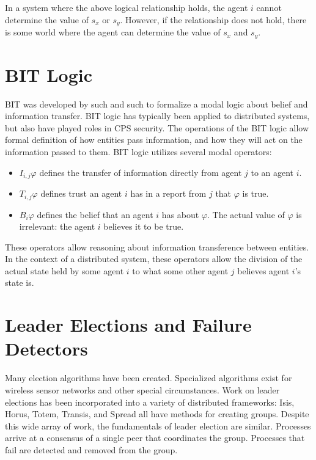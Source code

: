 In a system where the above logical relationship holds, the agent $i$ cannot determine the value of $s_x$ or $s_y$. However, if the relationship does not hold, there is some world where the agent can determine the value of $s_x$ and $s_y$.

\section{BIT Logic}

\ac{BIT} was developed by such and such to formalize a modal logic about belief and information transfer. \ac{BIT} logic has typically been applied to distributed systems, but also have played roles in \ac{CPS} security. The operations of the \ac{BIT} logic allow formal definition of how entities pass information, and how they will act on the information passed to them. \ac{BIT} logic utilizes several modal operators:

\begin{itemize}
\item $I_{i,j} \varphi$ defines the transfer of information directly from agent $j$ to an agent $i$. 
\item $T_{i,j} \varphi$ defines trust an agent $i$ has in a report from $j$ that $\varphi$ is true.
\item $B_i \varphi$ defines the belief that an agent $i$ has about $\varphi$. The actual value of $\varphi$ is irrelevant: the agent $i$ believes it to be true.
\end{itemize}

These operators allow reasoning about information transference between entities. In the context of a distributed system, these operators allow the division of the actual state held by some agent $i$ to what some other agent $j$ believes agent $i$'s state is.

\section{Leader Elections and Failure Detectors}

Many election algorithms have been created.
Specialized algorithms exist for wireless sensor networks\cite{LE-WSN-1}\cite{LE-WSN-2} and other special circumstances\cite{LE-SPECIALCIRCUMSTANCES-1}\cite{LE-SPECIALCIRCUMSTANCES-2}.
Work on leader elections has been incorporated into a variety of distributed frameworks: Isis\cite{ISISTOOLKIT}, Horus\cite{HORUSTOOLKIT}, Totem\cite{TOTEMTOOLKIT}, Transis\cite{TRANSISTOOLKIT}, and Spread\cite{SPREADTOOLKIT} all have methods for creating groups.
Despite this wide array of work, the fundamentals of leader election are similar.
Processes arrive at a consensus of a single peer that coordinates the group.
Processes that fail are detected and removed from the group.

